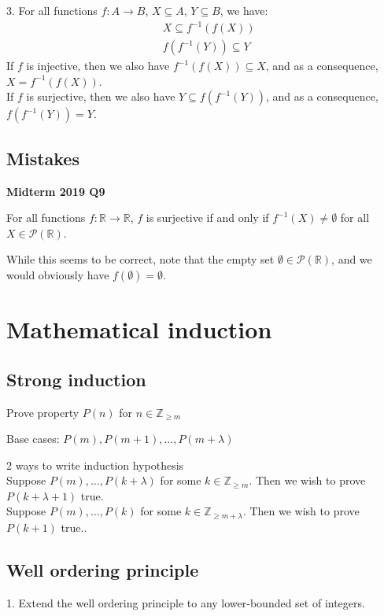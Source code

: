 \documentclass{article}
\begin{document}
3. For all functions $f:A\rightarrow B$, $X\subseteq A,\, Y\subseteq B$, we have:
\begin{align*}
    &X\subseteq f^{-1}(f(X))\\
    &f(f^{-1}(Y))\subseteq Y
\end{align*}
If $f$ is injective, then we also have $f^{-1}(f(X))\subseteq X$, and as a consequence, $X = f^{-1}(f(X))$.\\
If $f$ is surjective, then we also have $Y\subseteq f(f^{-1}(Y))$, and as a consequence, $f(f^{-1}(Y)) = Y$.

\subsection{Mistakes}
\textbf{Midterm 2019 Q9}

For all functions $f: \mathbb{R}\rightarrow \mathbb{R}$, $f$ is surjective if and only if $f^{-1}(X)\neq \emptyset$ for all $X\in \mathcal{P}(\mathbb{R})$.

While this seems to be correct, note that the empty set $\emptyset \in \mathcal{P}(\mathbb{R})$, and we would obviously have $f(\emptyset)=\emptyset$.

\section{Mathematical induction}
\subsection{Strong induction}
Prove property $P(n)$ for $n\in \mathbb{Z}_{\geq m}$

Base cases: $P(m),P(m+1),\dots,P(m+\lambda)$

2 ways to write induction hypothesis\\
Suppose $P(m),\dots,P(k+\lambda)$ for some $k\in \mathbb{Z}_{\geq m}$. Then we wish to prove $P(k+\lambda+1)$ true.\\
Suppose $P(m),\dots,P(k)$ for some $k\in \mathbb{Z}_{\geq m+\lambda}$. Then we wish to prove $P(k+1)$ true..

\subsection{Well ordering principle}
1. Extend the well ordering principle to any lower-bounded set of integers.
\end{document}
